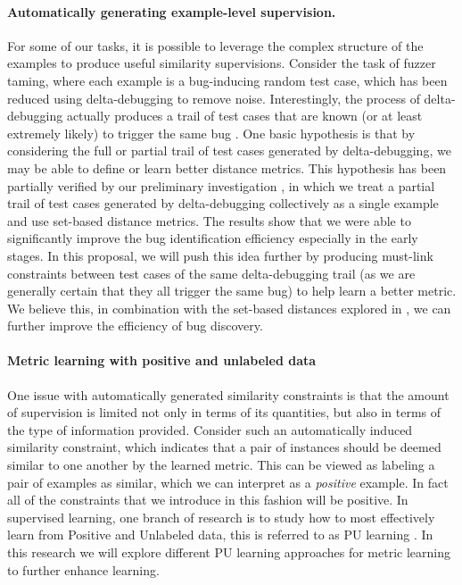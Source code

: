 \paragraph{Automatically generating example-level supervision.} 
\label{sec:autosuper}

For some of our tasks, it is possible to leverage the complex
structure of the examples to produce useful similarity
supervisions. Consider the task of fuzzer taming, where each example
is a bug-inducing random test case, which has been reduced using
delta-debugging to remove noise.  Interestingly, the process of
delta-debugging actually produces a trail of test cases that are known
(or at least extremely likely) to trigger the same bug
\cite{PLDI13}. One basic hypothesis is that by considering the full or
partial trail of test cases generated by delta-debugging, we may be
able to define or learn better distance metrics. This hypothesis has
been partially verified by our preliminary investigation
\cite{DDTrail}, in which we treat a partial trail of test cases
generated by delta-debugging collectively as a single example and use
set-based distance metrics. The results show that we were able to
significantly improve the bug identification efficiency especially in
the early stages. In this proposal, we will push this idea further by
producing must-link constraints between test cases of the same
delta-debugging trail (as we are generally certain that they all
trigger the same bug) to help learn a better metric. We believe this,
in combination with the set-based distances explored in
\cite{DDTrail}, we can further improve the efficiency of bug
discovery.

\paragraph{Metric learning with positive and unlabeled data}
One issue with automatically generated similarity constraints is that
the amount of supervision is limited not only in terms of its
quantities, but also in terms of the type of information
provided. Consider such an automatically induced similarity
constraint, which indicates that a pair of instances should be deemed
similar to one another by the learned metric. This can be viewed as
labeling a pair of examples as similar, which we can interpret as a
\emph{positive} example. In fact all of the constraints that we
introduce in this fashion will be positive. In supervised learning,
one branch of research is to study how to most effectively learn from
Positive and Unlabeled data, this is referred to as PU learning
\cite{}. In this research we will explore different PU learning
approaches for metric learning to further enhance learning.

